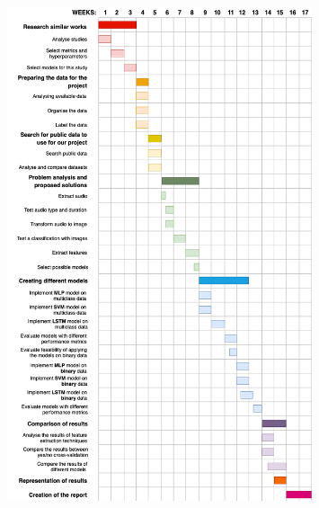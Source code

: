 \begin{figure}[h]
\centering
    \includegraphics[width=0.8\textwidth]{figures/ChartGantt.png}
\label{fig:Gantt}
\end{figure}

